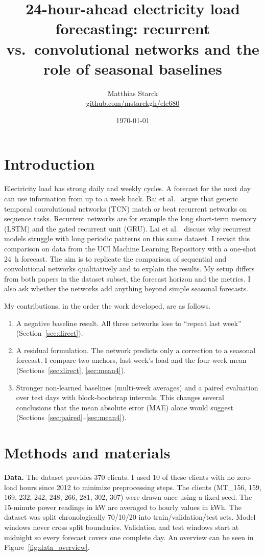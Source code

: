 \documentclass[10pt,a4paper]{article}
\title{24-hour-ahead electricity load forecasting: recurrent vs.\ convolutional networks and the role of seasonal baselines}
\author{Matthias Starck\\
\href{https://github.com/mstarckgh/ele680}{github.com/mstarckgh/ele680}}
\date{\today}
\begin{document}
\maketitle

\section{Introduction}
Electricity load has strong daily and weekly cycles. A forecast for the next day can use information from up to a week back. Bai et al.\ \cite{bai} argue that generic temporal convolutional networks (TCN) match or beat recurrent networks on sequence tasks. Recurrent networks are for example the long short-term memory (LSTM) and the gated recurrent unit (GRU). Lai et al.\ \cite{lai} discuss why recurrent models struggle with long periodic patterns on this same dataset. I revisit this comparison on data from the UCI Machine Learning Repository \cite{uci} with a one-shot 24~h forecast. The aim is to replicate the comparison of sequential and convolutional networks qualitatively and to explain the results. My setup differs from both papers in the dataset subset, the forecast horizon and the metrics. I also ask whether the networks add anything beyond simple seasonal forecasts.

My contributions, in the order the work developed, are as follows.
\begin{enumerate}\itemsep0pt
  \item A negative baseline result. All three networks lose to ``repeat last week'' (Section~\ref{sec:direct}).
  \item A residual formulation. The network predicts only a correction to a seasonal forecast. I compare two anchors, last week's load and the four-week mean (Sections~\ref{sec:direct}, \ref{sec:mean4}).
  \item Stronger non-learned baselines (multi-week averages) and a paired evaluation over test days with block-bootstrap intervals. This changes several conclusions that the mean absolute error (MAE) alone would suggest (Sections~\ref{sec:paired}--\ref{sec:mean4}).
\end{enumerate}

\section{Methods and materials}
\textbf{Data.} The dataset provides 370 clients. I used 10 of these clients with no zero-load hours since 2012 to minimize preprocessing steps. The clients (MT\_156, 159, 169, 232, 242, 248, 266, 281, 302, 307) were drawn once using a fixed seed. The 15-minute power readings in kW are averaged to hourly values in kWh. The dataset was split chronologically 70/10/20 into train/validation/test sets. Model windows never cross split boundaries. Validation and test windows start at midnight so every forecast covers one complete day. An overview can be seen in Figure~\ref{fig:data_overview}.
\end{document}
